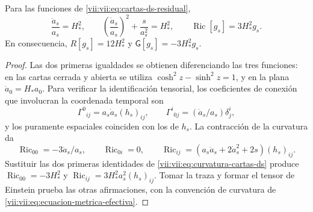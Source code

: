 \begin{lemma}
\label{vii:vii:lem:curvatura-cartas-ds}
Para las funciones de \eqref{vii:vii:eq:cartas-ds-residual},
\begin{equation}
 \frac{\ddot a_s}{a_s}=H_*^2,\qquad
 \left(\frac{\dot a_s}{a_s}\right)^2+\frac{s}{a_s^2}=H_*^2,
 \qquad
 \operatorname{Ric}[g_s]=3H_*^2g_s.
 \label{vii:vii:eq:curvatura-cartas-ds}
\end{equation}
En consecuencia, \(R[g_s]=12H_*^2\) y
\(\mathsf G[g_s]=-3H_*^2g_s\).
\end{lemma}
\begin{proof}
Las dos primeras igualdades se obtienen diferenciando las tres funciones:
en las cartas cerrada y abierta se utiliza
\(\cosh^2z-\sinh^2z=1\), y en la plana
\(\dot a_0=H_*a_0\). Para verificar la identificación tensorial,
los coeficientes de conexión que involucran la coordenada temporal son
\[
 \Gamma^0{}_{ij}=a_s\dot a_s(h_s)_{ij},\qquad
 \Gamma^i{}_{0j}=(\dot a_s/a_s)\delta^i_j,
\]
y los puramente espaciales coinciden con los de \(h_s\).
La contracción de la curvatura da
\[
 \operatorname{Ric}_{00}=-3\ddot a_s/a_s,\qquad
 \operatorname{Ric}_{0i}=0,\qquad
 \operatorname{Ric}_{ij}
  =(a_s\ddot a_s+2\dot a_s^2+2s)(h_s)_{ij}.
\]
Sustituir las dos primeras identidades de
\eqref{vii:vii:eq:curvatura-cartas-ds} produce
\(\operatorname{Ric}_{00}=-3H_*^2\) y
\(\operatorname{Ric}_{ij}=3H_*^2a_s^2(h_s)_{ij}\).
Tomar la traza y formar el tensor de Einstein prueba las otras
afirmaciones, con la convención de curvatura de
\eqref{vii:vii:eq:ecuacion-metrica-efectiva}.
\end{proof}


